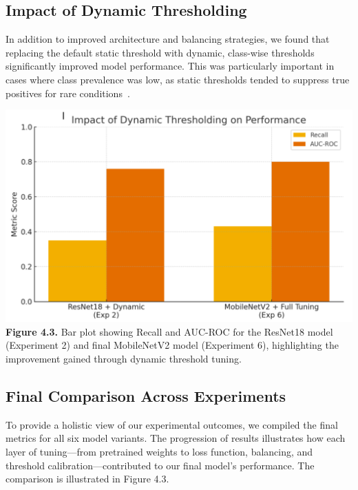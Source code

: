 \documentclass[12pt]{article}
\begin{document}
\begin{multicols}{2}
\subsection{Impact of Dynamic Thresholding}

In addition to improved architecture and balancing strategies, we found that replacing the default static threshold with dynamic, class-wise thresholds significantly improved model performance. This was particularly important in cases where class prevalence was low, as static thresholds tended to suppress true positives for rare conditions~\cite{12}.

\begin{center}
    \includegraphics[width=\linewidth]{figure4.3.png}
    \textbf{Figure 4.3.} Bar plot showing Recall and AUC-ROC for the ResNet18 model (Experiment 2) and final MobileNetV2 model (Experiment 6), highlighting the improvement gained through dynamic threshold tuning.
\end{center}

\subsection{Final Comparison Across Experiments}

To provide a holistic view of our experimental outcomes, we compiled the final metrics for all six model variants. The progression of results illustrates how each layer of tuning—from pretrained weights to loss function, balancing, and threshold calibration—contributed to our final model’s performance. The comparison is illustrated in Figure 4.3.


\end{multicols}
\end{document}
